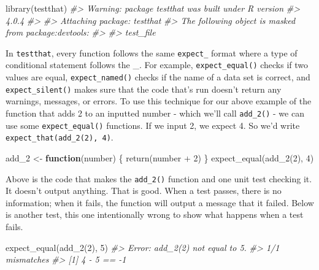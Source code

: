 \documentclass[
  12pt,
  openany]{book}
\newenvironment{Shaded}{\begin{snugshade}}{\end{snugshade}}
\newcommand{\CommentTok}[1]{\textcolor[rgb]{0.37,0.37,0.37}{\textit{#1}}}
\newcommand{\ControlFlowTok}[1]{\textcolor[rgb]{0.27,0.27,0.27}{\textbf{#1}}}
\newcommand{\DecValTok}[1]{\textcolor[rgb]{0.06,0.06,0.06}{#1}}
\newcommand{\FunctionTok}[1]{\textcolor[rgb]{0,0,0}{#1}}
\newcommand{\NormalTok}[1]{#1}
\newcommand{\OtherTok}[1]{\textcolor[rgb]{0.37,0.37,0.37}{#1}}
\newcommand{\SpecialCharTok}[1]{\textcolor[rgb]{0,0,0}{#1}}
\begin{document}
\begin{Shaded}
\begin{Highlighting}[]
\FunctionTok{library}\NormalTok{(testthat)}
\CommentTok{\#\textgreater{} Warning: package \textquotesingle{}testthat\textquotesingle{} was built under R version}
\CommentTok{\#\textgreater{} 4.0.4}
\CommentTok{\#\textgreater{} }
\CommentTok{\#\textgreater{} Attaching package: \textquotesingle{}testthat\textquotesingle{}}
\CommentTok{\#\textgreater{} The following object is masked from \textquotesingle{}package:devtools\textquotesingle{}:}
\CommentTok{\#\textgreater{} }
\CommentTok{\#\textgreater{}     test\_file}
\end{Highlighting}
\end{Shaded}

In \texttt{testthat}, every function follows the same \texttt{expect\_} format where a type of conditional statement follows the \_. For example, \texttt{expect\_equal()} checks if two values are equal, \texttt{expect\_named()} checks if the name of a data set is correct, and \texttt{expect\_silent()} makes sure that the code that's run doesn't return any warnings, messages, or errors. To use this technique for our above example of the function that adds 2 to an inputted number - which we'll call \texttt{add\_2()} - we can use some \texttt{expect\_equal()} functions. If we input 2, we expect 4. So we'd write \texttt{expect\_that(add\_2(2),\ 4)}.

\begin{Shaded}
\begin{Highlighting}[]
\NormalTok{add\_2 }\OtherTok{\textless{}{-}} \ControlFlowTok{function}\NormalTok{(number) \{ }\FunctionTok{return}\NormalTok{(number }\SpecialCharTok{+} \DecValTok{2}\NormalTok{) \}}
\FunctionTok{expect\_equal}\NormalTok{(}\FunctionTok{add\_2}\NormalTok{(}\DecValTok{2}\NormalTok{), }\DecValTok{4}\NormalTok{)}
\end{Highlighting}
\end{Shaded}

Above is the code that makes the \texttt{add\_2()} function and one unit test checking it. It doesn't output anything. That is good. When a test passes, there is no information; when it fails, the function will output a message that it failed. Below is another test, this one intentionally wrong to show what happens when a test fails.

\begin{Shaded}
\begin{Highlighting}[]
\FunctionTok{expect\_equal}\NormalTok{(}\FunctionTok{add\_2}\NormalTok{(}\DecValTok{2}\NormalTok{), }\DecValTok{5}\NormalTok{)}
\CommentTok{\#\textgreater{} Error: add\_2(2) not equal to 5.}
\CommentTok{\#\textgreater{} 1/1 mismatches}
\CommentTok{\#\textgreater{} [1] 4 {-} 5 == {-}1}
\end{Highlighting}
\end{Shaded}
\end{document}
